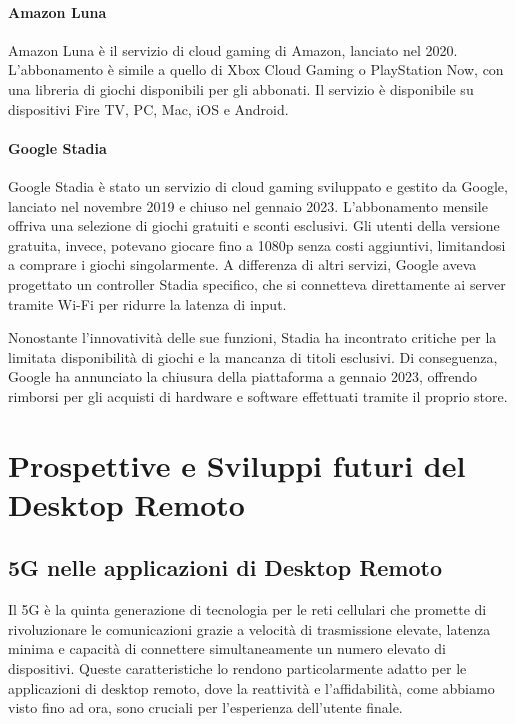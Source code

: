 \documentclass[12pt,a4paper,openright,twoside]{book}
\begin{document}
\subsubsection{Amazon Luna}
Amazon Luna è il servizio di cloud gaming di Amazon, lanciato nel 2020. L'abbonamento è simile a quello di Xbox Cloud Gaming o PlayStation Now, con una libreria di giochi disponibili per gli abbonati. Il servizio è disponibile su dispositivi Fire TV, PC, Mac, iOS e Android.

\subsubsection{Google Stadia}
Google Stadia è stato un servizio di cloud gaming sviluppato e gestito da Google, lanciato nel novembre 2019 e chiuso nel gennaio 2023. L'abbonamento mensile offriva una selezione di giochi gratuiti e sconti esclusivi. Gli utenti della versione gratuita, invece, potevano giocare fino a 1080p senza costi aggiuntivi, limitandosi a comprare i giochi singolarmente.
A differenza di altri servizi, Google aveva progettato un controller Stadia specifico, che si connetteva direttamente ai server tramite Wi-Fi per ridurre la latenza di input.

Nonostante l'innovatività delle sue funzioni, Stadia ha incontrato critiche per la limitata disponibilità di giochi e la mancanza di titoli esclusivi. Di conseguenza, Google ha annunciato la chiusura della piattaforma a gennaio 2023, offrendo rimborsi per gli acquisti di hardware e software effettuati tramite il proprio store.




\chapter{Prospettive e Sviluppi futuri del Desktop Remoto}


\section{5G nelle applicazioni di Desktop Remoto}
\label{sec:5g}

Il 5G è la quinta generazione di tecnologia per le reti cellulari che promette di rivoluzionare le comunicazioni grazie a velocità di trasmissione elevate, latenza minima e capacità di connettere simultaneamente un numero elevato di dispositivi. Queste caratteristiche lo rendono particolarmente adatto per le applicazioni di desktop remoto, dove la reattività e l'affidabilità, come abbiamo visto fino ad ora, sono cruciali per l'esperienza dell'utente finale.
\end{document}
